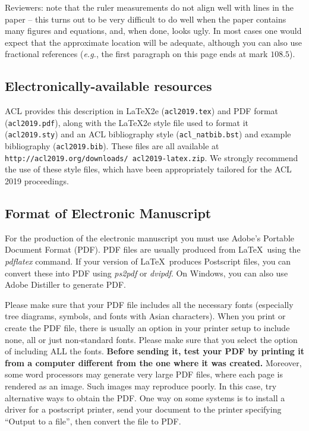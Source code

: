 \documentclass[11pt,a4paper]{article}
\begin{document}
Reviewers: note that the ruler measurements do not align well with
lines in the paper -- this turns out to be very difficult to do well
when the paper contains many figures and equations, and, when done,
looks ugly. In most cases one would expect that the approximate
location will be adequate, although you can also use fractional
references (\emph{e.g.}, the first paragraph on this page ends at mark $108.5$).

\subsection{Electronically-available resources}

ACL provides this description in \LaTeX2e{} (\texttt{\small acl2019.tex}) and PDF
format (\texttt{\small acl2019.pdf}), along with the \LaTeX2e{} style file used to
format it (\texttt{\small acl2019.sty}) and an ACL bibliography style (\texttt{\small acl\_natbib.bst})
and example bibliography (\texttt{\small acl2019.bib}).
These files are all available at
\texttt{\small http://acl2019.org/downloads/ acl2019-latex.zip}. 
 We
strongly recommend the use of these style files, which have been
appropriately tailored for the ACL 2019 proceedings.

\subsection{Format of Electronic Manuscript}
\label{sect:pdf}

For the production of the electronic manuscript you must use Adobe's
Portable Document Format (PDF). PDF files are usually produced from
\LaTeX\ using the \textit{pdflatex} command. If your version of
\LaTeX\ produces Postscript files, you can convert these into PDF
using \textit{ps2pdf} or \textit{dvipdf}. On Windows, you can also use
Adobe Distiller to generate PDF.

Please make sure that your PDF file includes all the necessary fonts
(especially tree diagrams, symbols, and fonts with Asian
characters). When you print or create the PDF file, there is usually
an option in your printer setup to include none, all or just
non-standard fonts.  Please make sure that you select the option of
including ALL the fonts. \textbf{Before sending it, test your PDF by
  printing it from a computer different from the one where it was
  created.} Moreover, some word processors may generate very large PDF
files, where each page is rendered as an image. Such images may
reproduce poorly. In this case, try alternative ways to obtain the
PDF. One way on some systems is to install a driver for a postscript
printer, send your document to the printer specifying ``Output to a
file'', then convert the file to PDF.
\end{document}

